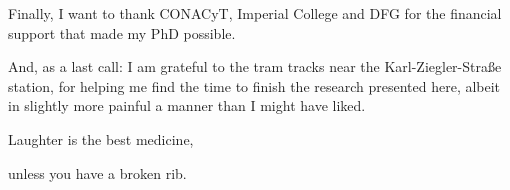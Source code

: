 \vspace{\ackskip}
\noindent
Finally, I want to thank CONACyT, Imperial College and DFG for the financial support that made my PhD possible.


\vspace{\ackskip}
\noindent
And, as a last call: I am grateful to the tram tracks near the Karl-Ziegler-Straße station, for helping me find the time to finish the research presented here, albeit in slightly more painful a manner than I might have liked.




\vspace{1.25cm}

\hfill Laughter is the best medicine,

\hfill unless you have a broken rib.



















